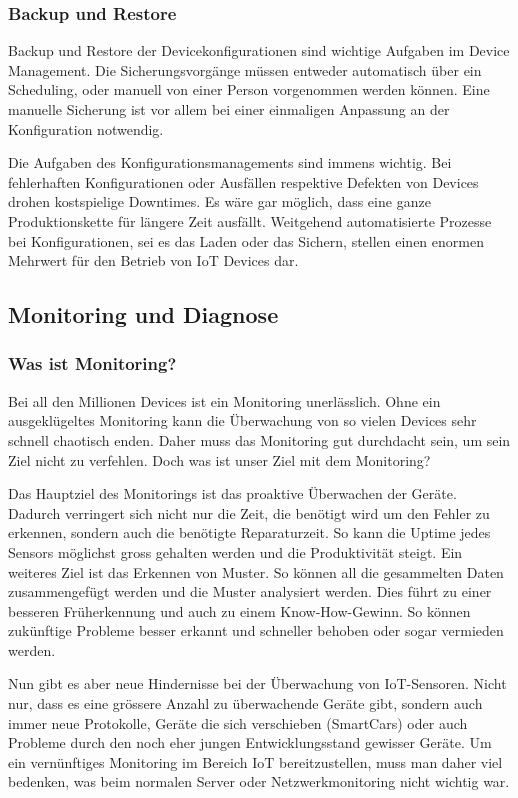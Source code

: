 \subsubsection{Backup und Restore} Backup und Restore der Devicekonfigurationen sind wichtige Aufgaben im Device Management. Die Sicherungsvorgänge müssen entweder automatisch über ein Scheduling, oder manuell von einer Person vorgenommen werden können. Eine manuelle Sicherung ist vor allem bei einer einmaligen Anpassung an der Konfiguration notwendig. 

Die Aufgaben des Konfigurationsmanagements sind immens wichtig. Bei fehlerhaften Konfigurationen oder Ausfällen respektive Defekten von Devices drohen kostspielige Downtimes. Es wäre gar möglich, dass eine ganze Produktionskette für längere Zeit ausfällt. Weitgehend automatisierte Prozesse bei Konfigurationen, sei es das Laden oder das Sichern, stellen einen enormen Mehrwert für den Betrieb von IoT Devices dar.
\subsection{Monitoring und Diagnose}
\subsubsection{Was ist Monitoring?}
Bei all den Millionen Devices ist ein Monitoring unerlässlich. Ohne ein ausgeklügeltes Monitoring kann die Überwachung von so vielen Devices sehr schnell chaotisch enden. Daher muss das Monitoring gut durchdacht sein, um sein Ziel nicht zu verfehlen. Doch was ist unser Ziel mit dem Monitoring?

Das Hauptziel des Monitorings ist das proaktive Überwachen der Geräte. Dadurch verringert sich nicht nur die Zeit, die benötigt wird um den Fehler zu erkennen, sondern auch die benötigte Reparaturzeit. So kann die Uptime jedes Sensors möglichst gross gehalten werden und die Produktivität steigt. Ein weiteres Ziel ist das Erkennen von Muster. So können all die gesammelten Daten zusammengefügt werden und die Muster analysiert werden. Dies führt zu einer besseren Früherkennung und auch zu einem Know-How-Gewinn. So können zukünftige Probleme besser erkannt und schneller behoben oder sogar vermieden werden.\cite{MonZiele}

Nun gibt es aber neue Hindernisse bei der Überwachung von IoT-Sensoren. Nicht nur, dass es eine grössere Anzahl zu überwachende Geräte gibt, sondern auch immer neue Protokolle, Geräte die sich verschieben (SmartCars) oder auch Probleme durch den noch eher jungen Entwicklungsstand gewisser Geräte. Um ein vernünftiges Monitoring im Bereich IoT bereitzustellen, muss man daher viel bedenken, was beim normalen Server oder Netzwerkmonitoring nicht wichtig war.
